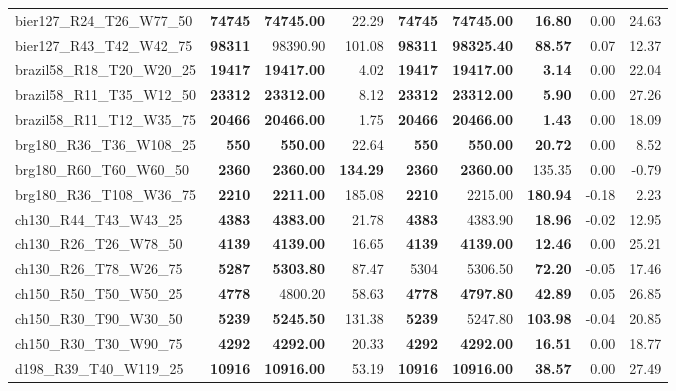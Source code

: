 \documentclass{singlecol-new}
\begin{document}
{\begin{longtable}{lrrrrrrrr}
		bier127\_R24\_T26\_W77\_50 & \textbf{74745} & \textbf{74745.00} & 22.29 & \textbf{74745} & \textbf{74745.00} & \textbf{16.80} & 0.00 & 24.63 \\
		bier127\_R43\_T42\_W42\_75 & \textbf{98311} & 98390.90 & 101.08 & \textbf{98311} & \textbf{98325.40} & \textbf{88.57} & 0.07 & 12.37 \\
		brazil58\_R18\_T20\_W20\_25 & \textbf{19417} & \textbf{19417.00} & 4.02 & \textbf{19417} & \textbf{19417.00} & \textbf{3.14} & 0.00 & 22.04 \\
		brazil58\_R11\_T35\_W12\_50 & \textbf{23312} & \textbf{23312.00} & 8.12 & \textbf{23312} & \textbf{23312.00} & \textbf{5.90} & 0.00 & 27.26 \\
		brazil58\_R11\_T12\_W35\_75 & \textbf{20466} & \textbf{20466.00} & 1.75 & \textbf{20466} & \textbf{20466.00} & \textbf{1.43} & 0.00 & 18.09 \\
		brg180\_R36\_T36\_W108\_25 & \textbf{550} & \textbf{550.00} & 22.64 & \textbf{550} & \textbf{550.00} & \textbf{20.72} & 0.00 & 8.52 \\
		brg180\_R60\_T60\_W60\_50 & \textbf{2360} & \textbf{2360.00} & \textbf{134.29} & \textbf{2360} & \textbf{2360.00} & 135.35 & 0.00 & -0.79 \\
		brg180\_R36\_T108\_W36\_75 & \textbf{2210} & \textbf{2211.00} & 185.08 & \textbf{2210} & 2215.00 & \textbf{180.94} & -0.18 & 2.23 \\
		ch130\_R44\_T43\_W43\_25 & \textbf{4383} & \textbf{4383.00} & 21.78 & \textbf{4383} & 4383.90 & \textbf{18.96} & -0.02 & 12.95 \\
		ch130\_R26\_T26\_W78\_50 & \textbf{4139} & \textbf{4139.00} & 16.65 & \textbf{4139} & \textbf{4139.00} & \textbf{12.46} & 0.00 & 25.21 \\
		ch130\_R26\_T78\_W26\_75 & \textbf{5287} & \textbf{5303.80} & 87.47 & 5304 & 5306.50 & \textbf{72.20} & -0.05 & 17.46 \\
		ch150\_R50\_T50\_W50\_25 & \textbf{4778} & 4800.20 & 58.63 & \textbf{4778} & \textbf{4797.80} & \textbf{42.89} & 0.05 & 26.85 \\
		ch150\_R30\_T90\_W30\_50 & \textbf{5239} & \textbf{5245.50} & 131.38 & \textbf{5239} & 5247.80 & \textbf{103.98} & -0.04 & 20.85 \\
		ch150\_R30\_T30\_W90\_75 & \textbf{4292} & \textbf{4292.00} & 20.33 & \textbf{4292} & \textbf{4292.00} & \textbf{16.51} & 0.00 & 18.77 \\
		d198\_R39\_T40\_W119\_25 & \textbf{10916} & \textbf{10916.00} & 53.19 & \textbf{10916} & \textbf{10916.00} & \textbf{38.57} & 0.00 & 27.49 \\

\end{longtable}}
\end{document}
